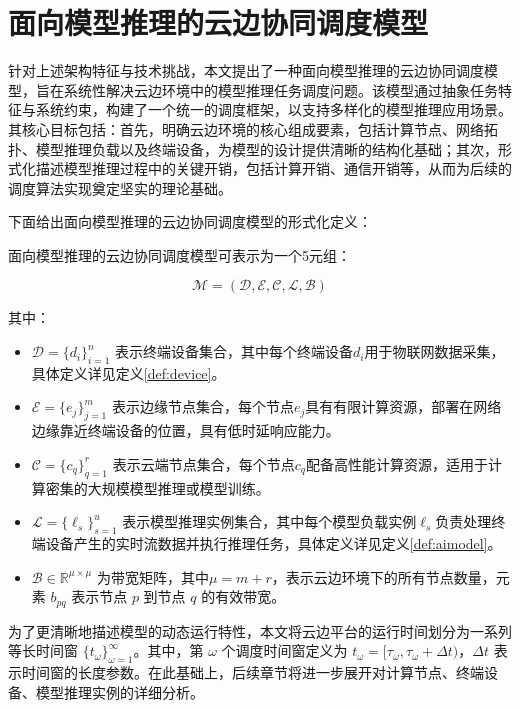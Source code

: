 \section{面向模型推理的云边协同调度模型}

针对上述架构特征与技术挑战，本文提出了一种面向模型推理的云边协同调度模型，旨在系统性解决云边环境中的模型推理任务调度问题。该模型通过抽象任务特征与系统约束，构建了一个统一的调度框架，以支持多样化的模型推理应用场景。其核心目标包括：首先，明确云边环境的核心组成要素，包括计算节点、网络拓扑、模型推理负载以及终端设备，为模型的设计提供清晰的结构化基础；其次，形式化描述模型推理过程中的关键开销，包括计算开销、通信开销等，从而为后续的调度算法实现奠定坚实的理论基础。

下面给出面向模型推理的云边协同调度模型的形式化定义：

\begin{definition}[面向模型推理的云边协同调度模型]
面向模型推理的云边协同调度模型可表示为一个5元组：
\end{definition}

$$
\mathcal{M} = (\mathcal{D}, \mathcal{E}, \mathcal{C}, \mathcal{L}, \mathcal{B})
$$

其中：

\begin{itemize}
    \item $\mathcal{D} = \{d_i\}_{i=1}^n$ 表示终端设备集合，其中每个终端设备$d_i$用于物联网数据采集，具体定义详见定义\ref{def:device}。
    \item $\mathcal{E} = \{e_j\}_{j=1}^m$ 表示边缘节点集合，每个节点$e_j$具有有限计算资源，部署在网络边缘靠近终端设备的位置，具有低时延响应能力。
    \item $\mathcal{C} = \{c_q\}_{q=1}^r$ 表示云端节点集合，每个节点$c_q$配备高性能计算资源，适用于计算密集的大规模模型推理或模型训练。
    \item $\mathcal{L} = \{\ell_s\}_{s=1}^u$ 表示模型推理实例集合，其中每个模型负载实例$\ell_s$负责处理终端设备产生的实时流数据并执行推理任务，具体定义详见定义\ref{def:aimodel}。
    \item $\mathcal{B} \in \mathbb{R}^{\mu \times \mu}$ 为带宽矩阵，其中$\mu=m+r$，表示云边环境下的所有节点数量，元素 $b_{pq}$ 表示节点 $p$ 到节点 $q$ 的有效带宽。
\end{itemize}

为了更清晰地描述模型的动态运行特性，本文将云边平台的运行时间划分为一系列等长时间窗 $\{t_\omega\}_{\omega=1}^\infty$。其中，第 $\omega$ 个调度时间窗定义为 $t_\omega = [\tau_\omega, \tau_\omega + \Delta t)$，$\Delta t$ 表示时间窗的长度参数。在此基础上，后续章节将进一步展开对计算节点、终端设备、模型推理实例的详细分析。

